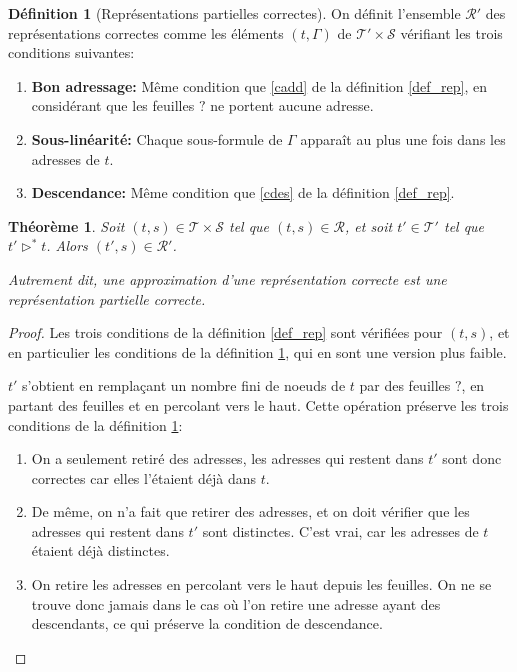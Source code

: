 \documentclass[11pt,a4paper]{article}
\theoremstyle{plain}
\newtheorem{theorem}{Théorème}
\theoremstyle{definition}
\newtheorem{definition}{Définition}
\theoremstyle{remark}
\newcommand*{\sequent}{\Gamma}
\newcommand*{\sequents}{\ensuremath{\mathcal{S}}}
\newcommand*{\trees}{\ensuremath{\mathcal{T}}}
\newcommand*{\treespartial}{\ensuremath{\mathcal{T'}}}
\newcommand*{\representationslarge}{\ensuremath{\trees \times \sequents}}
\newcommand*{\representations}{\ensuremath{\mathcal{R}}}
\newcommand*{\representationspartiallarge}{\ensuremath{\treespartial \times \sequents}}
\newcommand*{\representationspartial}{\ensuremath{\mathcal{R'}}}
\newcommand*{\relapprox}{\ensuremath{\triangleright}}
\newcommand*{\relapproxlarge}{\ensuremath{\relapprox^*}}
\newcommand*{\unknown}{\ensuremath{?}}
\begin{document}
\begin{definition}[Représentations partielles correctes]
    \label{def_rep_partial}
    On définit l'ensemble \representationspartial{} des représentations correctes comme les éléments $(t, \sequent)$ de $\representationspartiallarge$ vérifiant les trois conditions suivantes:
    
    \begin{enumerate}
    \item\label{caddpartial} \textbf{Bon adressage:} Même condition que \ref{cadd} de la définition \ref{def_rep}, en considérant que les feuilles \unknown{} ne portent aucune adresse.
    \item\label{clinpartial} \textbf{Sous-linéarité:} Chaque sous-formule de $\sequent$ apparaît au plus une fois dans les adresses de $t$.
    \item\label{cdespartial} \textbf{Descendance:} Même condition que \ref{cdes} de la définition \ref{def_rep}.
    \end{enumerate}
\end{definition}

\begin{theorem}
    Soit $(t, s) \in \representationslarge$ tel que $(t, s) \in \representations$, et soit $t' \in \treespartial$ tel que $t' \relapproxlarge t$. Alors $(t', s) \in \representationspartial$.
    
    Autrement dit, une approximation d'une représentation correcte est une représentation partielle correcte.
\end{theorem}

\begin{proof}
    Les trois conditions de la définition \ref{def_rep} sont vérifiées pour $(t, s)$, et en particulier les conditions de la définition \ref{def_rep_partial}, qui en sont une version plus faible. 
    
    $t'$ s'obtient en remplaçant un nombre fini de noeuds de $t$ par des feuilles $?$, en partant des feuilles et en percolant vers le haut. Cette opération préserve les trois conditions de la définition \ref{def_rep_partial}:

    \begin{enumerate}
        \item On a seulement retiré des adresses, les adresses qui restent dans $t'$ sont donc correctes car elles l'étaient déjà dans $t$.

        \item De même, on n'a fait que retirer des adresses, et on doit vérifier que les adresses qui restent dans $t'$ sont distinctes. C'est vrai, car les adresses de $t$ étaient déjà distinctes.

        \item On retire les adresses en percolant vers le haut depuis les feuilles. On ne se trouve donc jamais dans le cas où l'on retire une adresse ayant des descendants, ce qui préserve la condition de descendance.
    \end{enumerate}
\end{proof}
\end{document}
